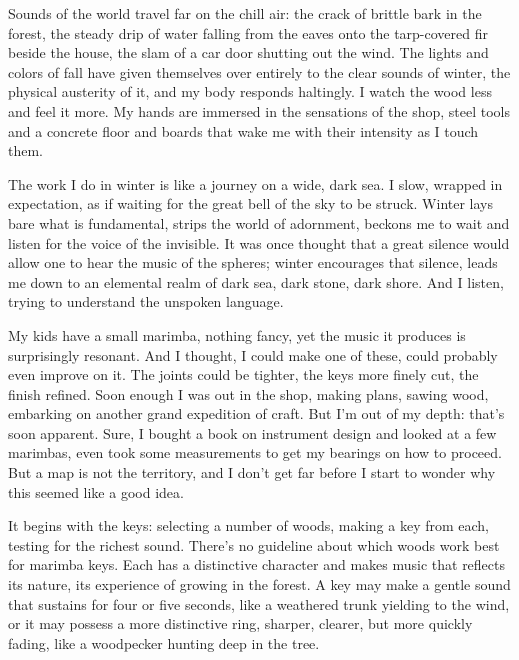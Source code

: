\documentclass[letterpaper,10pt,headsepline]{scrreprt}
\begin{document}
Sounds of the world travel far on the chill air: the crack of brittle bark in the forest, the steady drip of water falling from the eaves onto the tarp-covered fir beside the house, the slam of a car door shutting out the wind. The lights and colors of fall have given themselves over entirely to the clear sounds of winter, the physical austerity of it, and my body responds haltingly. I watch the wood less and feel it more. My hands are immersed in the sensations of the shop, steel tools and a concrete floor and boards that wake me with their intensity as I touch them.

The work I do in winter is like a journey on a wide, dark sea. I slow, wrapped in expectation, as if waiting for the great bell of the sky to be struck. Winter lays bare what is fundamental, strips the world of adornment, beckons me to wait and listen for the voice of the invisible. It was once thought that a great silence would allow one to hear the music of the spheres; winter encourages that silence, leads me down to an elemental realm of dark sea, dark stone, dark shore. And I listen, trying to understand the unspoken language.

My kids have a small marimba, nothing fancy, yet the music it produces is surprisingly resonant. And I thought, I could make one of these, could probably even improve on it. The joints could be tighter, the keys more finely cut, the finish refined. Soon enough I was out in the shop, making plans, sawing wood, embarking on another grand expedition of craft. But I’m out of my depth: that’s soon apparent. Sure, I bought a book on instrument design and looked at a few marimbas, even took some measurements to get my bearings on how to proceed. But a map is not the territory, and I ­don’t get far before I start to wonder why this seemed like a good idea.

It begins with the keys: selecting a number of woods, making a key from each, testing for the richest sound. There’s no guideline about which woods work best for marimba keys. Each has a distinctive character and makes music that reflects its nature, its experience of growing in the forest. A key may make a gentle sound that sustains for four or five seconds, like a weathered trunk yielding to the wind, or it may possess a more distinctive ring, sharper, clearer, but more quickly fading, like a woodpecker hunting deep in the tree.
\end{document}
